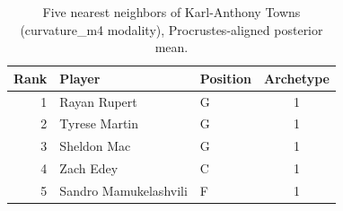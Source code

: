 \begin{table}[htbp]
  \centering\small
  \begin{tabular}{rllc}
    \toprule
    Rank & Player & Position & Archetype \\
    \midrule
    1 & Rayan Rupert & G & 1 \\
    2 & Tyrese Martin & G & 1 \\
    3 & Sheldon Mac & G & 1 \\
    4 & Zach Edey & C & 1 \\
    5 & Sandro Mamukelashvili & F & 1 \\
    \bottomrule
  \end{tabular}
  \caption{Five nearest neighbors of Karl-Anthony Towns (curvature_m4 modality), Procrustes-aligned posterior mean.}
  \label{tab:Karl_Anthony_Towns_neighbors_curvature_m4}
\end{table}


